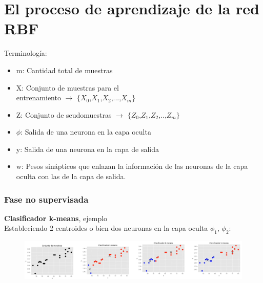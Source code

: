 \documentclass[
	11pt, %
]{beamer}
\begin{document}
\section{El proceso de aprendizaje de la red RBF}

\begin{frame}
  Terminología:
  \begin{itemize}
  \item m: Cantidad total de muestras
  \item X: Conjunto de muestras para el \\entrenamiento $\rightarrow$ $\{X_{0}$,$X_{1}$,$X_{2}$,...,$X_{m}\}$
  \item Z: Conjunto de seudomuestras $\rightarrow$ $\{Z_{0}$,$Z_{1}$,$Z_{2}$,..,$Z_{m}\}$
  \item $\phi$: Salida de una neurona en la capa oculta
  \item y: Salida de una neurona en la capa de salida
  \item w: Pesos sinápticos que enlazan la información de las neuronas de la capa oculta con las de la capa de salida.
  \end{itemize}
\end{frame}

\begin{frame}
  \frametitle{Fase no supervisada}

  \textbf{Clasificador k-means}, ejemplo\\
  Estableciendo 2 centroides o bien dos neuronas en la capa oculta $\phi_{1}$, $\phi_{2}$:

  \begin{figure}
    \includegraphics[width=1.0\linewidth]{kmeans.png}
  \end{figure}
  
\end{frame}
\end{document}
